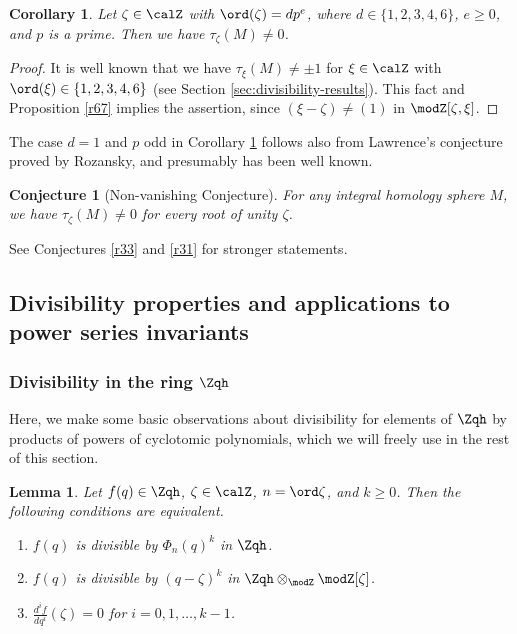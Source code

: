 \documentclass{amsart}
\numberwithin{equation}{section}
\numberwithin{figure}{section}
\theoremstyle{plain}
\newtheorem{lemma}[theorem]{Lemma}
\newtheorem{corollary}[theorem]{Corollary}
\newtheorem{conjecture}[theorem]{Conjecture}
\theoremstyle{definition}
\theoremstyle{remark}
\begin{document}
\begin{corollary}
  \label{r71}
  Let $\zeta \in \calZ$ with $\ord(\zeta )=dp^e$, where $d\in \{1,2,3,4,6\}$,
  $e\ge 0$, and $p$ is a prime.  Then we have $\tau _\zeta (M)\neq0$.
\end{corollary}

\begin{proof}
  It is well known that we have $\tau _\xi (M)\neq\pm 1$ for $\xi \in \calZ$ with
  $\ord(\xi )\in \{1,2,3,4,6\}$ (see Section
  \ref{sec:divisibility-results}).  This fact and Proposition
  \ref{r67} implies the assertion, since $(\xi -\zeta )\neq(1)$ in
  $\modZ [\zeta ,\xi ]$.
\end{proof}

The case $d=1$ and $p$ odd in Corollary \ref{r71} follows also from
Lawrence's conjecture proved by Rozansky, and presumably has been well
known.

\begin{conjecture}[Non-vanishing Conjecture]
  \label{r73}
  For any integral homology sphere $M$, we have $\tau _\zeta (M)\neq0$ for
  every root of unity $\zeta $.
\end{conjecture}

See Conjectures \ref{r33} and \ref{r31} for stronger statements.

\subsection{Divisibility properties and applications to power series
  invariants}
\label{sec:divisibility-jm-1}

\subsubsection{Divisibility in the ring $\Zqh$}
\label{sec:divis-ring-zqh}

Here, we make some basic observations about divisibility for elements
of $\Zqh$ by products of powers of cyclotomic polynomials, which we
will freely use in the rest of this section.

\begin{lemma}
  \label{r66}
  Let $f(q)\in \Zqh$, $\zeta \in \calZ$, $n=\ord\zeta $, and $k\ge 0$.  Then the
  following conditions are equivalent.
  \begin{enumerate}
  \item\label{item:9} $f(q)$ is divisible by $\Phi _n(q)^k$ in $\Zqh$.
  \item\label{item:10} $f(q)$ is divisible by $(q-\zeta )^k$ in
  $\Zqh\otimes _\modZ \modZ [\zeta ]$.
  \item\label{item:11} $\frac{d^if}{dq^i}(\zeta )=0$ for $i=0,1,\ldots,k-1$.
  \end{enumerate}
\end{lemma}
\end{document}
